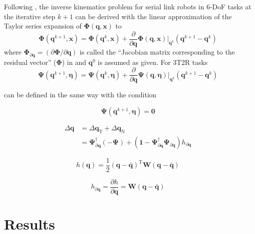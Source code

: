 \documentclass[robotics,article,submit,moreauthors,pdftex]{Definitions/mdpi}
\newcommand{\bm}[1]{\boldsymbol{#1}}
\newcommand{\transp}[0]{{\mathrm{T}}}
\begin{document}
Following \cite{GoldenbergBenFen1985}, the inverse kinematics problem for serial link robots in 6-DoF tasks at the iterative step $k+1$ can be derived with the linear approximation of the Taylor series expansion of $\bm{\Phi}(\bm{q},\bm{x})$ to
%
\begin{equation}
\bm{\Phi}(\bm{q}^{k+1},\bm{x}) = 
\bm{\Phi}(\bm{q}^{k},\bm{x})
+
\frac{\partial}{\partial \bm{q}} \bm{\Phi}(\bm{q},\bm{x}) \biggr\rvert_{\bm{q}^k} (\bm{q}^{k+1} - \bm{q}^k)
\label{equ:taylor_phi}
\end{equation}
%
where $\bm{\Phi}_{\partial\bm{q}}=(\partial \bm{\Phi} / \partial \bm{q})$ is called the ``Jacobian matrix corresponding to the residual vector'' ($\bm{\Phi}$) in \cite{GoldenbergBenFen1985} and $\bm{q}^0$ is assumed as given.
%
For 3T2R tasks
%
\begin{equation}
\bm{\Psi}(\bm{q}^{k+1},\bm{\eta}) = 
\bm{\Psi}(\bm{q}^{k},\bm{\eta})
+
\frac{\partial}{\partial \bm{q}} \bm{\Psi}(\bm{q},\bm{\eta}) \biggr\rvert_{\bm{q}^k} (\bm{q}^{k+1} - \bm{q}^k)
\label{equ:taylor_psi}
\end{equation}

can be defined in the same way with the condition

\begin{equation}
\bm{\Psi}(\bm{q}^{k+1},\bm{\eta})=\bm{0}
\end{equation}



\begin{align}
{\Delta}\bm{q}
&=
{\Delta}\bm{q}_{\mathrm{T}} + {\Delta}\bm{q}_{\mathrm{N}} \nonumber \\
&=
\bm{\Psi}_{\partial\bm{q}}^{\dagger} (-\bm{\Psi}) +  (\bm{1}-\bm{\Psi}_{\partial\bm{q}}^{\dagger}\bm{\Psi}_{\partial\bm{q}}) h_{\partial\bm{q}}
\label{equ:nullspace}
\end{align}


\begin{equation}
h(\bm{q})
=
\frac{1}{2} (\bm{q}-\bar{\bm{q}})^\transp\bm{W}(\bm{q}-\bar{\bm{q}})
\end{equation}  

\begin{equation}
h_{\partial\bm{q}}
=
\frac{\partial h}{\partial \bm{q}}
=
\bm{W}(\bm{q}-\bar{\bm{q}})
\end{equation}



\section{Results}
\label{sec:Ergebnisse}
\end{document}
